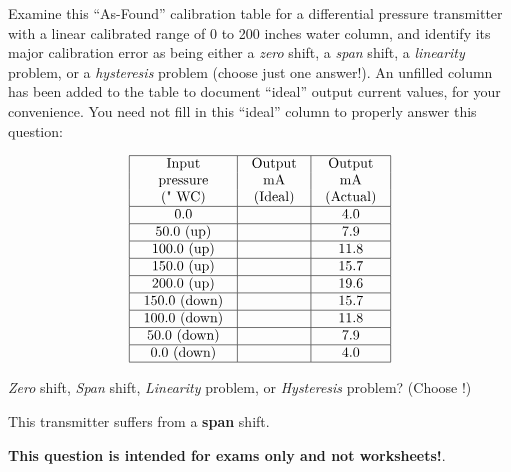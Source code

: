 

Examine this ``As-Found'' calibration table for a differential pressure transmitter with a linear calibrated range of 0 to 200 inches water column, and identify its major calibration error as being either a {\it zero} shift, a {\it span} shift, a {\it linearity} problem, or a {\it hysteresis} problem (choose just one answer!).  An unfilled column has been added to the table to document ``ideal'' output current values, for your convenience.  You need not fill in this ``ideal'' column to properly answer this question:


$$\vbox{\offinterlineskip
\halign{\strut
\vrule \quad\hfil # \ \hfil & 
\vrule \quad\hfil # \ \hfil & 
\vrule \quad\hfil # \ \hfil \vrule \cr
\noalign{\hrule}
%
Input & Output & Output \cr
%
pressure & mA & mA \cr
%
(" WC) & (Ideal) & (Actual) \cr
%
\noalign{\hrule}
%
0.0 & & 4.0 \cr
%
\noalign{\hrule}
%
50.0 (up) & & 7.9 \cr
%
\noalign{\hrule}
%
100.0 (up) & & 11.8 \cr
%
\noalign{\hrule}
%
150.0 (up) & & 15.7 \cr
%
\noalign{\hrule}
%
200.0 (up) & & 19.6 \cr
%
\noalign{\hrule}
%
150.0 (down) & & 15.7 \cr
%
\noalign{\hrule}
%
100.0 (down) & & 11.8 \cr
%
\noalign{\hrule}
%
50.0 (down) & & 7.9 \cr
%
\noalign{\hrule}
%
0.0 (down) & & 4.0 \cr
%
\noalign{\hrule}
} %
}$$ %

{\it Zero} shift, {\it Span} shift, {\it Linearity} problem, or {\it Hysteresis} problem?  (Choose !)







This transmitter suffers from a {\bf span} shift.







{\bf This question is intended for exams only and not worksheets!}.


